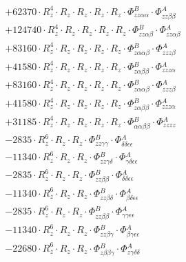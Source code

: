 \documentclass{article}
\begin{document}
\begin{subequations}
\begin{gather}
\begin{array}{c}
 \\[0.2em] 		 + 62370 \cdot R_{z}^{4} \cdot R_{z} \cdot R_{z} \cdot R_{z} \cdot R_{z} \cdot \Phi{}^{B}_{zz\alpha{}\alpha{}} \cdot \Phi{}^{A}_{zz\beta{}\beta{}} 
 \\[0.2em] 		 + 124740 \cdot R_{z}^{4} \cdot R_{z} \cdot R_{z} \cdot R_{z} \cdot R_{z} \cdot \Phi{}^{B}_{zz\alpha{}\beta{}} \cdot \Phi{}^{A}_{zz\alpha{}\beta{}} 
 \\[0.2em] 		 + 83160 \cdot R_{z}^{4} \cdot R_{z} \cdot R_{z} \cdot R_{z} \cdot R_{z} \cdot \Phi{}^{B}_{z\alpha{}\alpha{}\beta{}} \cdot \Phi{}^{A}_{zzz\beta{}} 
 \\[0.2em] 		 + 41580 \cdot R_{z}^{4} \cdot R_{z} \cdot R_{z} \cdot R_{z} \cdot R_{z} \cdot \Phi{}^{B}_{z\alpha{}\beta{}\beta{}} \cdot \Phi{}^{A}_{zzz\alpha{}} 
 \\[0.2em] 		 + 83160 \cdot R_{z}^{4} \cdot R_{z} \cdot R_{z} \cdot R_{z} \cdot R_{z} \cdot \Phi{}^{B}_{z\alpha{}\alpha{}\beta{}} \cdot \Phi{}^{A}_{zzz\beta{}} 
 \\[0.2em] 		 + 41580 \cdot R_{z}^{4} \cdot R_{z} \cdot R_{z} \cdot R_{z} \cdot R_{z} \cdot \Phi{}^{B}_{z\alpha{}\beta{}\beta{}} \cdot \Phi{}^{A}_{zzz\alpha{}} 
 \\[0.2em] 		 + 31185 \cdot R_{z}^{4} \cdot R_{z} \cdot R_{z} \cdot R_{z} \cdot R_{z} \cdot \Phi{}^{B}_{\alpha{}\alpha{}\beta{}\beta{}} \cdot \Phi{}^{A}_{zzzz} 
 \\[0.2em] 		 - 2835 \cdot R_{z}^{6} \cdot R_{z} \cdot R_{z} \cdot \Phi{}^{B}_{zz\gamma{}\gamma{}} \cdot \Phi{}^{A}_{\delta{}\delta{}\epsilon{}\epsilon{}} 
 \\[0.2em] 		 - 11340 \cdot R_{z}^{6} \cdot R_{z} \cdot R_{z} \cdot \Phi{}^{B}_{zz\gamma{}\delta{}} \cdot \Phi{}^{A}_{\gamma{}\delta{}\epsilon{}\epsilon{}} 
 \\[0.2em] 		 - 2835 \cdot R_{z}^{6} \cdot R_{z} \cdot R_{z} \cdot \Phi{}^{B}_{zz\beta{}\beta{}} \cdot \Phi{}^{A}_{\delta{}\delta{}\epsilon{}\epsilon{}} 
 \\[0.2em] 		 - 11340 \cdot R_{z}^{6} \cdot R_{z} \cdot R_{z} \cdot \Phi{}^{B}_{zz\beta{}\delta{}} \cdot \Phi{}^{A}_{\beta{}\delta{}\epsilon{}\epsilon{}} 
 \\[0.2em] 		 - 2835 \cdot R_{z}^{6} \cdot R_{z} \cdot R_{z} \cdot \Phi{}^{B}_{zz\beta{}\beta{}} \cdot \Phi{}^{A}_{\gamma{}\gamma{}\epsilon{}\epsilon{}} 
 \\[0.2em] 		 - 11340 \cdot R_{z}^{6} \cdot R_{z} \cdot R_{z} \cdot \Phi{}^{B}_{zz\beta{}\gamma{}} \cdot \Phi{}^{A}_{\beta{}\gamma{}\epsilon{}\epsilon{}} 
 \\[0.2em] 		 - 22680 \cdot R_{z}^{6} \cdot R_{z} \cdot R_{z} \cdot \Phi{}^{B}_{z\beta{}\beta{}\gamma{}} \cdot \Phi{}^{A}_{z\gamma{}\delta{}\delta{}} 

\end{array}
\end{gather}
\end{subequations}
\end{document}
